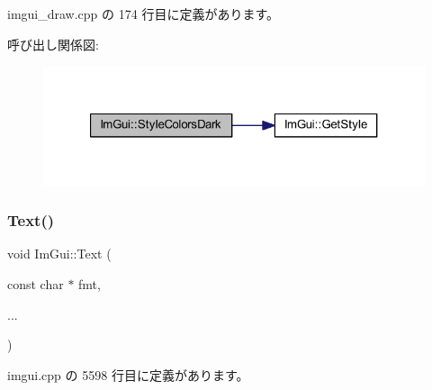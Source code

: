  imgui\+\_\+draw.\+cpp の 174 行目に定義があります。

呼び出し関係図\+:\nopagebreak
\begin{figure}[H]
\begin{center}
\leavevmode
\includegraphics[width=321pt]{namespace_im_gui_a26c67fc14081b359566d5e135cd8c767_cgraph}
\end{center}
\end{figure}
\mbox{\label{namespace_im_gui_a9e7b83611fe441d54fad2effb4bf4965}} 
\subsubsection{\texorpdfstring{Text()}{Text()}}
{\footnotesize\ttfamily void Im\+Gui\+::\+Text (\begin{DoxyParamCaption}\item[{const char $\ast$}]{fmt,  }\item[{}]{... }\end{DoxyParamCaption})}



 imgui.\+cpp の 5598 行目に定義があります。

